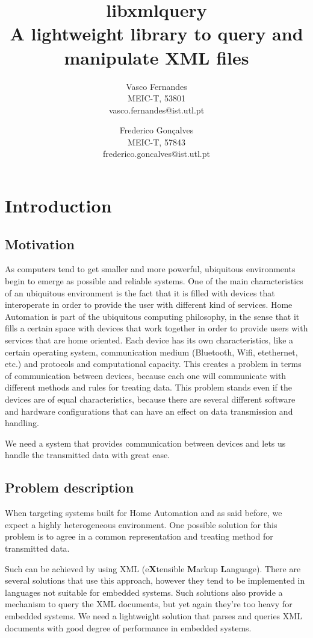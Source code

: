 \documentclass[a4paper]{report}
\title{\textbf{\Huge{libxmlquery}}\\A lightweight library to query and manipulate XML files}
\author{
Vasco Fernandes\\
MEIC-T, 53801\\
vasco.fernandes@ist.utl.pt \\
\and
Frederico Gon\c{c}alves\\
MEIC-T, 57843\\
frederico.goncalves@ist.utl.pt\\
}
\begin{document}
\maketitle

\tableofcontents

\chapter{Introduction}

\section{Motivation} %
	As computers tend to get smaller and more powerful, ubiquitous environments begin to emerge as possible and reliable systems. One of the main characteristics of an ubiquitous environment is the fact that it is filled with 
	devices that interoperate in order to provide the user with different kind of services. Home Automation is part of the ubiquitous computing philosophy, in the sense that it fills a certain space with devices that work together in 
	order to provide users with services that are home oriented. Each device has its own characteristics, like a certain operating system, communication medium (Bluetooth, Wifi, etethernet, etc.) and protocols and 
	computational 	capacity. This creates a problem in terms of communication between devices, because each one will communicate with different methods and rules for treating data. This problem stands even if the devices 
	are of equal characteristics, because there are several different software and hardware configurations that can have an effect on data transmission and handling.
	
	We need a system that provides communication between devices and lets us handle the transmitted data with great ease.
	
\section{Problem description}
	When targeting systems built for Home Automation and as said before, we expect a highly heterogeneous environment. One possible solution for this problem is to agree in a common representation and treating method
	for transmitted data. 
	
	Such can be achieved by using XML (e\textbf{X}tensible \textbf{M}arkup \textbf{L}anguage). There are several solutions that use this approach, however they tend to be implemented in languages not suitable for 
	embedded systems. Such solutions also provide a mechanism to query the XML documents, but yet again they're too heavy for embedded systems. We need a lightweight solution that parses and queries XML 
	documents with good degree of performance in embedded systems.
	
\end{document}
